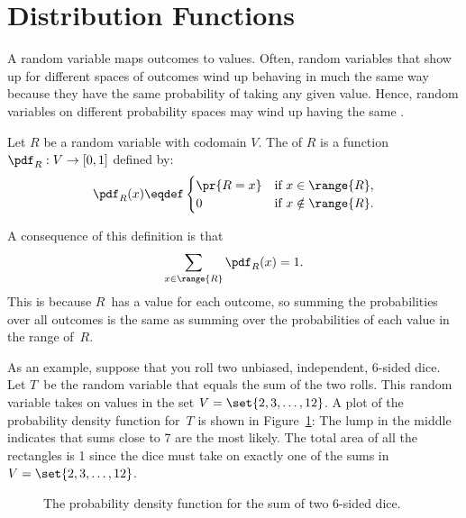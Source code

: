 \begin{problems}

\practiceproblems
{}

\homeworkproblems
{}

\end{problems}


\section{Distribution Functions}\label{distributions_sec}

A random variable maps outcomes to values.  Often, random variables
that show up for different spaces of outcomes wind up behaving in much
the same way because they have the same probability of taking any
given value.  Hence, random variables on different probability spaces
may wind up having the same .

\begin{definition}
Let $R$ be a random variable with codomain $V$.
The  of $R$
is a function $\pdf_R : V \to [0,1]$ defined by:
%
\[
\pdf_R(x) \eqdef \begin{cases}
            \pr{R = x} & \text{if } x \in \range{R},\\
             0 & \text{if } x \notin \range{R}.
           \end{cases}
\]
\end{definition}
%
A consequence of this definition is that
%
\[
\sum_{x \in \range{R}} \pdf_R(x) = 1.
\]
This is because $R$~has a value for each outcome, so summing the
probabilities over all outcomes is the same as summing over the
probabilities of each value in the range of~$R$.

As an example, suppose that you roll two unbiased, independent,
6-sided dice.  Let $T$~be the random variable that equals the sum of
the two rolls.  This random variable takes on values in the set $V =
\set{2, 3, \dots, 12}$.  A plot of the probability density function
for~$T$ is shown in Figure~\ref{fig:16F2}: The lump in the middle
indicates that sums close to 7 are the most likely.  The total area of
all the rectangles is 1 since the dice must take on exactly one of the
sums in $V = \set{2, 3, \dots, 12}$.

\begin{figure}


\caption{The probability density function for the sum of two 6-sided
  dice.}

\label{fig:16F2}

\end{figure}

